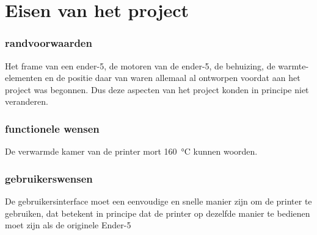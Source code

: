 \chapter{Eisen van het project}
\label{Eisen_van_het_project}

\subsection{randvoorwaarden}

Het frame van een ender-5, de motoren van de ender-5, de behuizing, de
warmte-elementen en de positie daar van waren allemaal al ontworpen voordat aan
het project was begonnen. Dus deze aspecten van het project konden in principe niet
veranderen.

\subsection{functionele wensen}

De verwarmde kamer van de printer mort \SI{160}{\celsius} kunnen woorden.

\subsection{gebruikerswensen}

De gebruikersinterface moet een eenvoudige en snelle manier zijn om de printer
te gebruiken, dat betekent in principe dat de printer op dezelfde manier te
bedienen moet zijn als de originele Ender-5


